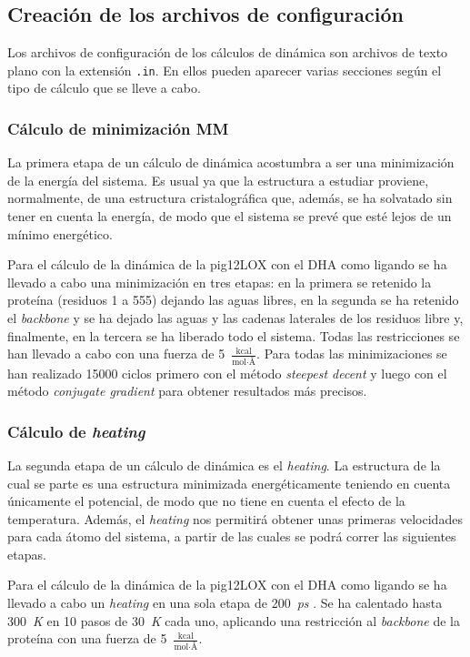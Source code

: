     \subsection{Creación de los archivos de configuración}
        Los archivos de configuración de los cálculos de dinámica son archivos de texto plano con la extensión \texttt{.in}. En ellos pueden aparecer varias secciones según el tipo de cálculo que se lleve a cabo.
        
        \subsubsection{Cálculo de minimización MM}
            La primera etapa de un cálculo de dinámica acostumbra a ser una minimización de la energía del sistema. Es usual ya que la estructura a estudiar proviene, normalmente, de una estructura cristalográfica que, además, se ha solvatado sin tener en cuenta la energía, de modo que el sistema se prevé que esté lejos de un mínimo energético. \par
            \textsf{Para el cálculo de la dinámica de la pig12LOX con el DHA como ligando se ha llevado a cabo una minimización en tres etapas: en la primera se retenido la proteína (residuos 1 a 555) dejando las aguas libres, en la segunda se ha retenido el \textit{backbone} y se ha dejado las aguas y las cadenas laterales de los residuos libre  y, finalmente, en la tercera se ha liberado todo el sistema. Todas las restricciones se han llevado a cabo con una fuerza de 5~\textit{$\frac{\text{kcal}}{\text{mol}\cdot\text{\AA}}$}. Para todas las minimizaciones se han realizado 15000 ciclos primero con el método \textit{steepest decent} y luego con el método \textit{conjugate gradient} para obtener resultados más precisos.}
            
        \subsubsection{Cálculo de \textit{heating}}
            La segunda etapa de un cálculo de dinámica es el \textit{heating}. La estructura de la cual se parte es una estructura minimizada energéticamente teniendo en cuenta únicamente el potencial, de modo que no tiene en cuenta el efecto de la temperatura. Además, el \textit{heating} nos permitirá obtener unas primeras velocidades para cada átomo del sistema, a partir de las cuales se podrá correr las siguientes etapas.\par
            \textsf{Para el cálculo de la dinámica de la pig12LOX con el DHA como ligando se ha llevado a cabo un \textit{heating} en una sola etapa de 200~\textit{ps} . Se ha calentado hasta 300~\textit{K} en 10 pasos de 30~\textit{K} cada uno, aplicando una restricción al \textit{backbone} de la proteína con una fuerza de 5~\textit{$\frac{\text{kcal}}{\text{mol}\cdot\text{\AA}}$}.}
        
